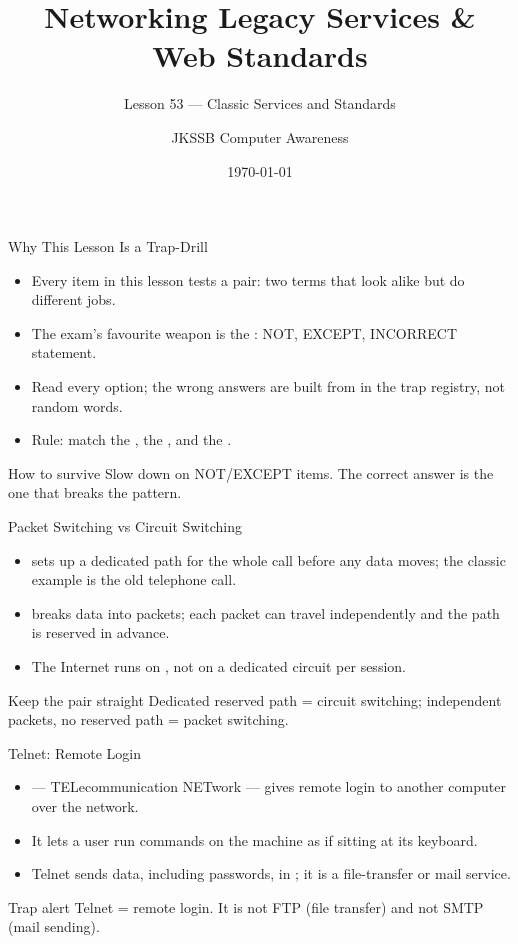 \documentclass[aspectratio=169]{beamer}
\title{Networking Legacy Services \& Web Standards}
\subtitle{Lesson 53 --- Classic Services and Standards}
\author{JKSSB Computer Awareness}
\date{\today}
\begin{document}
\frame{\titlepage}

\begin{frame}{Why This Lesson Is a Trap-Drill}
  \begin{itemize}
    \item Every item in this lesson tests a  pair: two
      terms that look alike but do different jobs.
    \item The exam's favourite weapon is the : NOT,
      EXCEPT, INCORRECT statement.
    \item Read every option; the wrong answers are built from  in the trap registry, not random words.
    \item Rule: match the , the , and the .
  \end{itemize}
  \begin{alertblock}{How to survive}
    Slow down on NOT/EXCEPT items. The correct answer is the one that breaks
    the pattern.
  \end{alertblock}
\end{frame}

\begin{frame}{Packet Switching vs Circuit Switching}
  \begin{itemize}
    \item {} sets up a dedicated path for the whole
      call before any data moves; the classic example is the old telephone
      call.
    \item {} breaks data into packets; each packet can
      travel independently and the path is  reserved in advance.
    \item The Internet runs on , not on a dedicated
      circuit per session.
  \end{itemize}
  \begin{block}{Keep the pair straight}
    Dedicated reserved path = circuit switching; independent packets, no
    reserved path = packet switching.
  \end{block}
\end{frame}

\begin{frame}{Telnet: Remote Login}
  \begin{itemize}
    \item {} --- TELecommunication NETwork --- gives remote login
      to another computer over the network.
    \item It lets a user run commands on the  machine as if
      sitting at its keyboard.
    \item Telnet sends data, including passwords, in ; it is
       a file-transfer or mail service.
  \end{itemize}
  \begin{alertblock}{Trap alert}
    Telnet = remote login. It is not FTP (file transfer) and not SMTP
    (mail sending).
  \end{alertblock}
\end{frame}
\end{document}
